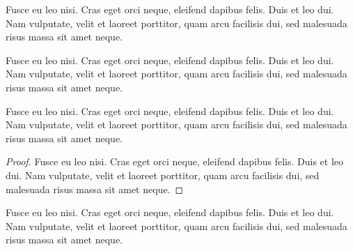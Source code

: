 \documentclass[a4paper,UKenglish,cleveref, autoref, thm-restate]{lipics-v2021}
\begin{document}
\begin{remark*}
Fusce eu leo nisi. Cras eget orci neque, eleifend dapibus felis. Duis et leo dui. Nam vulputate, velit et laoreet porttitor, quam arcu facilisis dui, sed malesuada risus massa sit amet neque.
\end{remark*}

\begin{claim}\label{testenv-claim}
Fusce eu leo nisi. Cras eget orci neque, eleifend dapibus felis. Duis et leo dui. Nam vulputate, velit et laoreet porttitor, quam arcu facilisis dui, sed malesuada risus massa sit amet neque.
\end{claim}

\begin{claim*}\label{testenv-claim2}
Fusce eu leo nisi. Cras eget orci neque, eleifend dapibus felis. Duis et leo dui. Nam vulputate, velit et laoreet porttitor, quam arcu facilisis dui, sed malesuada risus massa sit amet neque.
\end{claim*}

\begin{proof}
Fusce eu leo nisi. Cras eget orci neque, eleifend dapibus felis. Duis et leo dui. Nam vulputate, velit et laoreet porttitor, quam arcu facilisis dui, sed malesuada risus massa sit amet neque.
\end{proof}

\begin{claimproof}
Fusce eu leo nisi. Cras eget orci neque, eleifend dapibus felis. Duis et leo dui. Nam vulputate, velit et laoreet porttitor, quam arcu facilisis dui, sed malesuada risus massa sit amet neque.
\end{claimproof}
\end{document}
